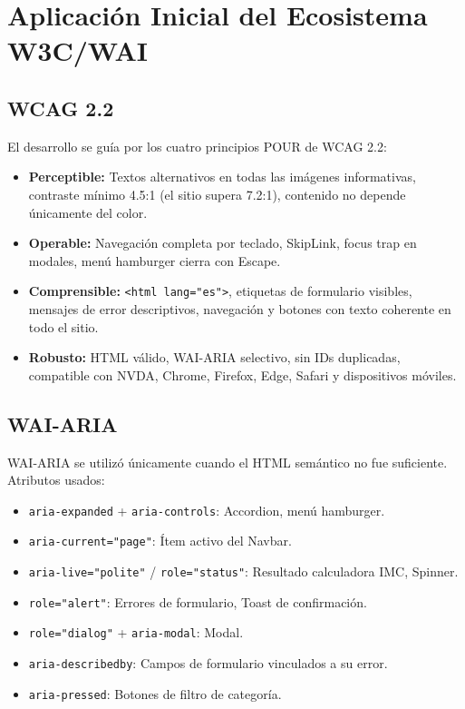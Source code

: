 \documentclass[12pt, a4paper]{article}
\begin{document}
\section{Aplicación Inicial del Ecosistema W3C/WAI}

\subsection{WCAG 2.2}

El desarrollo se guía por los cuatro principios POUR de WCAG 2.2:

\begin{itemize}
  \item \textbf{Perceptible:} Textos alternativos en todas las imágenes informativas, contraste mínimo 4.5:1 (el sitio supera 7.2:1), contenido no depende únicamente del color.
  \item \textbf{Operable:} Navegación completa por teclado, SkipLink, focus trap en modales, menú hamburger cierra con Escape.
  \item \textbf{Comprensible:} \texttt{<html lang="es">}, etiquetas de formulario visibles, mensajes de error descriptivos, navegación y botones con texto coherente en todo el sitio.
  \item \textbf{Robusto:} HTML válido, WAI-ARIA selectivo, sin IDs duplicadas, compatible con NVDA, Chrome, Firefox, Edge, Safari y dispositivos móviles.
\end{itemize}

\subsection{WAI-ARIA}

WAI-ARIA se utilizó únicamente cuando el HTML semántico no fue suficiente. Atributos usados:

\begin{itemize}
  \item \texttt{aria-expanded} + \texttt{aria-controls}: Accordion, menú hamburger.
  \item \texttt{aria-current="page"}: Ítem activo del Navbar.
  \item \texttt{aria-live="polite"} / \texttt{role="status"}: Resultado calculadora IMC, Spinner.
  \item \texttt{role="alert"}: Errores de formulario, Toast de confirmación.
  \item \texttt{role="dialog"} + \texttt{aria-modal}: Modal.
  \item \texttt{aria-describedby}: Campos de formulario vinculados a su error.
  \item \texttt{aria-pressed}: Botones de filtro de categoría.
\end{itemize}
\end{document}
